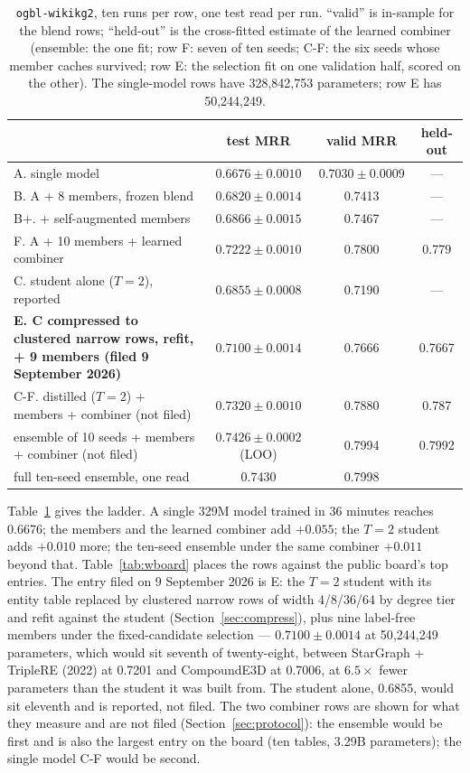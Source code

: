 \documentclass[11pt,a4paper]{article}
\begin{document}
\begin{table}[t]
\centering
\caption{\texttt{ogbl-wikikg2}, ten runs per row, one test read per run.
``valid'' is in-sample for the blend rows; ``held-out'' is the
cross-fitted estimate of the learned combiner (ensemble: the one fit;
row F: seven of ten seeds; C-F: the six seeds whose member caches survived;
row E: the selection fit on one validation half, scored on the other). The
single-model rows have 328{,}842{,}753 parameters; row E has 50{,}244{,}249.}
\label{tab:wiki}
\footnotesize
\setlength{\tabcolsep}{4pt}
\begin{tabular}{lccc}
\toprule
 & test MRR & valid MRR & held-out \\
\midrule
A. single model & $0.6676\pm0.0010$ & $0.7030\pm0.0009$ & --- \\
B. A + 8 members, frozen blend & $0.6820\pm0.0014$ & 0.7413 & --- \\
B+. + self-augmented members & $0.6866\pm0.0015$ & 0.7467 & --- \\
F. A + 10 members + learned combiner & $0.7222\pm0.0010$ & 0.7800 & 0.779 \\
\quad C. student alone ($T=2$), reported & $0.6855\pm0.0008$ & 0.7190 & --- \\
\textbf{E. C compressed to clustered narrow rows, refit, + 9 members (filed 9 September 2026)} & $\mathbf{0.7100\pm0.0014}$ & 0.7666 & 0.7667 \\
C-F. distilled ($T=2$) + members + combiner (not filed) & $0.7320\pm0.0010$ & 0.7880 & 0.787 \\
ensemble of 10 seeds + members + combiner (not filed) & $0.7426\pm0.0002$ (LOO) & 0.7994 & 0.7992 \\
\quad full ten-seed ensemble, one read & 0.7430 & 0.7998 & \\
\bottomrule
\end{tabular}
\end{table}

Table~\ref{tab:wiki} gives the ladder. A single 329M model trained in 36
minutes reaches 0.6676; the members and the learned combiner add
$+0.055$; the $T=2$ student adds $+0.010$ more; the ten-seed ensemble
under the same combiner $+0.011$ beyond that. Table~\ref{tab:wboard}
places the rows against the public board's top entries. The entry filed on 9 September 2026
is E: the $T=2$ student with its entity table replaced by clustered narrow
rows of width 4/8/36/64 by degree tier and refit against the student
(Section~\ref{sec:compress}), plus nine label-free members under the
fixed-candidate selection --- $0.7100\pm0.0014$ at 50{,}244{,}249
parameters, which would sit seventh of twenty-eight, between StarGraph +
TripleRE (2022) at 0.7201 and CompoundE3D at 0.7006, at $6.5\times$ fewer
parameters than the student it was built from. The student alone, 0.6855,
would sit eleventh and is reported, not filed.
The two combiner rows are shown for what they measure and are not filed
(Section~\ref{sec:protocol}): the ensemble would be first and is also
the largest entry on the board (ten tables, 3.29B parameters); the
single model C-F would be second.
\end{document}
